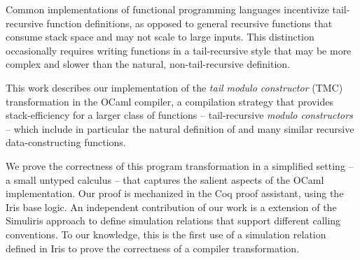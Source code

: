 Common implementations of functional programming languages incentivize tail-recursive function definitions, as opposed to general recursive functions that consume stack space and may not scale to large inputs.
%
This distinction occasionally requires writing functions in a tail-recursive style that may be more complex and slower than the natural, non-tail-recursive definition.

This work describes our implementation of the \emph{tail modulo constructor} (TMC) transformation in the OCaml compiler, a compilation strategy that provides stack-efficiency for a larger class of functions -- tail-recursive \emph{modulo constructors} -- which include in particular the natural definition of  and many similar recursive data-constructing functions.

We prove the correctness of this program transformation in a simplified setting -- a small untyped calculus -- that captures the salient aspects of the OCaml implementation. Our proof is mechanized in the Coq proof assistant, using the Iris base logic. An independent contribution of our work is a extension of the Simuliris approach to define simulation relations that support different calling conventions. To our knowledge, this is the first use of a simulation relation defined in Iris to prove the correctness of a compiler transformation.
